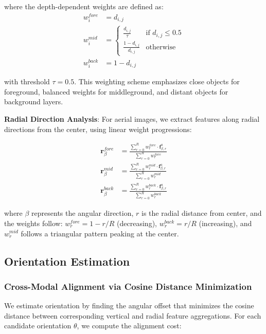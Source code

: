 \documentclass{bmvc2k}
\begin{document}
where the depth-dependent weights are defined as:
\begin{align}
w_i^{fore} &= d_{i,j} \\
w_i^{mid} &= \begin{cases} 
\frac{d_{i,j}}{\tau} & \text{if } d_{i,j} \leq 0.5 \\
\frac{1-d_{i,j}}{d_{i,j}} & \text{otherwise}
\end{cases} \\
w_i^{back} &= 1 - d_{i,j}
\end{align}

with threshold $\tau = 0.5$. This weighting scheme emphasizes close objects for foreground, balanced weights for middleground, and distant objects for background layers.

\textbf{Radial Direction Analysis}: For aerial images, we extract features along radial directions from the center, using linear weight progressions:

\begin{align}
\mathbf{r}_\beta^{fore} &= \frac{\sum_{r=0}^{R} w_r^{fore} \cdot \mathbf{f}_{\beta,r}^a}{\sum_{r=0}^{R} w_r^{fore}} \\
\mathbf{r}_\beta^{mid} &= \frac{\sum_{r=0}^{R} w_r^{mid} \cdot \mathbf{f}_{\beta,r}^a}{\sum_{r=0}^{R} w_r^{mid}} \\
\mathbf{r}_\beta^{back} &= \frac{\sum_{r=0}^{R} w_r^{back} \cdot \mathbf{f}_{\beta,r}^a}{\sum_{r=0}^{R} w_r^{back}}
\end{align}

where $\beta$ represents the angular direction, $r$ is the radial distance from center, and the weights follow: $w_r^{fore} = 1-r/R$ (decreasing), $w_r^{back} = r/R$ (increasing), and $w_r^{mid}$ follows a triangular pattern peaking at the center.

\subsection{Orientation Estimation}

\subsubsection{Cross-Modal Alignment via Cosine Distance Minimization}

We estimate orientation by finding the angular offset that minimizes the cosine distance between corresponding vertical and radial feature aggregations. For each candidate orientation $\theta$, we compute the alignment cost:
\end{document}
